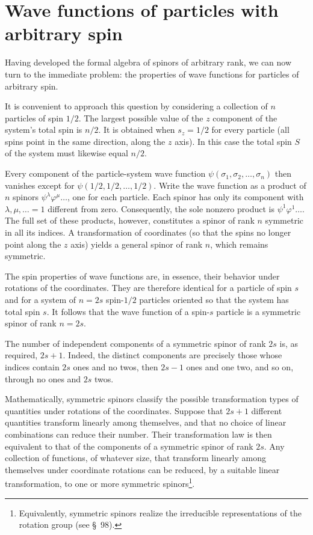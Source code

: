 \section{Wave functions of particles with arbitrary spin}

Having developed the formal algebra of spinors of arbitrary rank, we can now
turn to the immediate problem: the properties of wave functions for particles
of arbitrary spin.

It is convenient to approach this question by considering a collection of
$n$ particles of spin $1/2$. The largest possible value of the $z$ component
of the system's total spin is $n/2$. It is obtained when $s_z=1/2$ for every
particle (all spins point in the same direction, along the $z$ axis). In this
case the total spin $S$ of the system must likewise equal $n/2$.

Every component of the particle-system wave function
$\psi(\sigma_1,\sigma_2,\ldots,\sigma_n)$ then vanishes except for
$\psi(1/2,1/2,\ldots,1/2)$. Write the wave function as a product of $n$
spinors $\psi^\lambda\varphi^\mu\ldots$, one for each particle. Each spinor
has only its component with $\lambda,\mu,\ldots=1$ different from zero.
Consequently, the sole nonzero product is $\psi^1\varphi^1\ldots$. The full
set of these products, however, constitutes a spinor of rank $n$ symmetric in
all its indices. A transformation of coordinates (so that the spins no longer
point along the $z$ axis) yields a general spinor of rank $n$, which remains
symmetric.

The spin properties of wave functions are, in essence, their behavior under
rotations of the coordinates. They are therefore identical for a particle of
spin $s$ and for a system of $n=2s$ spin-$1/2$ particles oriented so that the
system has total spin $s$. It follows that the wave function of a spin-$s$
particle is a symmetric spinor of rank $n=2s$.

The number of independent components of a symmetric spinor of rank $2s$ is,
as required, $2s+1$. Indeed, the distinct components are precisely those
whose indices contain $2s$ ones and no twos, then $2s-1$ ones and one two,
and so on, through no ones and $2s$ twos.

Mathematically, symmetric spinors classify the possible transformation types
of quantities under rotations of the coordinates. Suppose that $2s+1$
different quantities transform linearly among themselves, and that no choice
of linear combinations can reduce their number. Their transformation law is
then equivalent to that of the components of a symmetric spinor of rank $2s$.
Any collection of functions, of whatever size, that transform linearly among
themselves under coordinate rotations can be reduced, by a suitable linear
transformation, to one or more symmetric spinors\footnote{Equivalently,
symmetric spinors realize the irreducible representations of the rotation
group (see \S~98).}.

